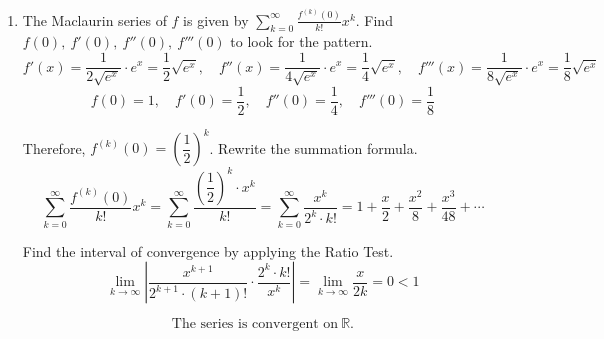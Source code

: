\documentclass[a4paper, 12pt]{article}
\renewcommand{\headrulewidth}{0pt}
\renewcommand{\headrulewidth}{0pt}
\begin{document}
\begin{enumerate}[leftmargin=*,label=\textbf{\arabic*.}]
We can also take the limit inside the function because $\ln x$ is continuous on its domain.
\begin{align*}\ln(L)&=\lim_{n\to\infty}\ln\left[\left(\frac1n\right)^{1/n}\right]=\lim_{n\to\infty}\frac{\ln\left(\frac1n\right)}{n}\end{align*}

To be able to use L'Hôpital's rule, take the corresponding function $f(x)=\dfrac{\ln\left(\frac1x\right)}x$.
\[\lim_{x\to\infty}\frac{\ln\left(\frac1x\right)}x\overset{\text{L'H.}}{=}\lim_{x\to\infty}\frac{x\cdot\left(-\frac1{x^2}\right)}1=\lim_{x\to\infty}-\frac1x=0\implies \ln(L)=0\implies L=1\]

The limit $\displaystyle\lim_{n\to\infty}(-1)^{n+1}$ does not exist because of oscillation. So, $\displaystyle\lim_{n\to\infty}(-1)^{n+1}\left(\frac1n\right)^{1/n}$ does not exist either. Therefore, by the $n$th Term Test for divergence, the series $\displaystyle\sum_{n=1}^{\infty}(-1)^{n+1}\left(\frac1n\right)^{1/n}$ is $\boxed{\text{divergent}}$.

\item The Maclaurin series of $f$ is given by $\sum_{k=0}^{\infty}\frac{f^{(k)}(0)}{k!}x^k$. Find $f(0),\:f'(0),\:f''(0),\:f'''(0)$ to look for the pattern.
\[f'(x)=\frac1{2\sqrt{ e^x}}\cdot e^x=\frac12\sqrt{ e^x},\quad f''(x)=\frac1{4\sqrt{ e^x}}\cdot e^x=\frac14\sqrt{ e^x},\quad f'''(x)=\frac1{8\sqrt{ e^x}}\cdot e^x=\frac18\sqrt{ e^x}\]
\[f(0)=1,\quad f'(0)=\frac12,\quad f''(0)=\frac14,\quad f'''(0)=\frac18\]

Therefore, $f^{(k)}(0)=\left(\dfrac12\right)^k$. Rewrite the summation formula.
\[\sum_{k=0}^{\infty}\frac{f^{(k)}(0)}{k!}x^k=\sum_{k=0}^{\infty}\frac{\left(\dfrac12\right)^k\cdot x^k}{k!}=\boxed{\sum_{k=0}^{\infty}\frac{x^k}{2^k\cdot k!}=1+\frac{x}2+\frac{x^2}8+\frac{x^3}{48}+\cdots}\]

Find the interval of convergence by applying the Ratio Test.
\[\lim_{k\to\infty}\left|\frac{x^{k+1}}{2^{k+1}\cdot\left(k+1\right)!}\cdot\frac{2^k\cdot k!}{x^k}\right|=\lim_{k\to\infty}\frac{x}{2k}=0<1\]

\[\boxed{\text{The series is convergent on}\:\mathbb{R}.}\]

\end{enumerate}

\newpage
{}
{}

\newpage
\pagestyle{fancy}
\renewcommand{\headrulewidth}{1pt}
\end{document}
